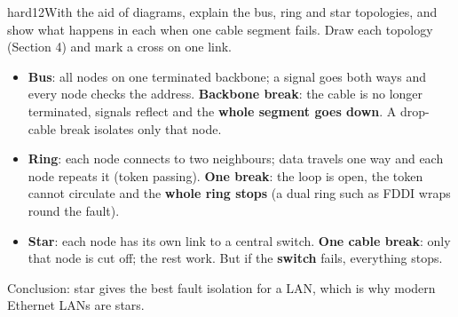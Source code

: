 \documentclass[10pt]{article}
\begin{document}
\begin{practice}{hard}{12}With the aid of diagrams, explain the bus, ring and star topologies, and show what happens in each when one cable segment fails.
\sol
Draw each topology (Section 4) and mark a cross on one link.
\begin{itemize}
\item \textbf{Bus}: all nodes on one terminated backbone; a signal goes both ways and every node checks the address. \textbf{Backbone break}: the cable is no longer terminated, signals reflect and the \textbf{whole segment goes down}. A drop-cable break isolates only that node.
\item \textbf{Ring}: each node connects to two neighbours; data travels one way and each node repeats it (token passing). \textbf{One break}: the loop is open, the token cannot circulate and the \textbf{whole ring stops} (a dual ring such as FDDI wraps round the fault).
\item \textbf{Star}: each node has its own link to a central switch. \textbf{One cable break}: only that node is cut off; the rest work. But if the \textbf{switch} fails, everything stops.
\end{itemize}
Conclusion: star gives the best fault isolation for a LAN, which is why modern Ethernet LANs are stars.
\end{practice}
\end{document}
